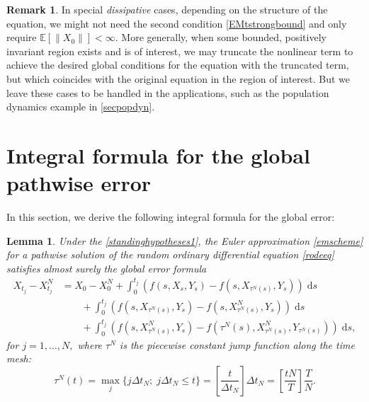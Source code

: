 \documentclass[reqno,12pt]{amsart}
\theoremstyle{plain} %
\newtheorem{lemma}{Lemma}[section]
\theoremstyle{definition} %
\newtheorem{remark}{Remark}[section]
\begin{document}
\begin{remark}
    In special \emph{dissipative} cases, depending on the structure of the equation, we might not need the second condition \eqref{EMtstrongbound} and only require $\mathbb{E}[\|X_0\|] < \infty$. More generally, when some bounded, positively invariant region exists and is of interest, we may truncate the nonlinear term to achieve the desired global conditions for the equation with the truncated term, but which coincides with the original equation in the region of interest. But we leave these cases to be handled in the applications, such as the population dynamics example in \cref{secpopdyn}.
\end{remark}

\section{Integral formula for the global pathwise error}

In this section, we derive the following integral formula for the global error:
\begin{lemma}
    \label{lemglobalerrorintegralformula}
    Under the \cref{standinghypotheses1}, the Euler approximation \eqref{emscheme} for a pathwise solution of the random ordinary differential equation \eqref{rodeeq} satisfies almost surely the global error formula
    \begin{equation}
        \label{globalerrorintegralformula}
        \begin{aligned}
            X_{t_j} - X_{t_j}^N & = X_0 - X_0^N + \int_0^{t_j} \left( f(s, X_s, Y_s) - f(s, X_{\tau^N(s)}, Y_s) \right)\;\mathrm{d}s  \\ 
            & \qquad + \int_{0}^{t_j} \left( f(s, X_{\tau^N(s)}, Y_s) - f(s, X_{\tau^N(s)}^N, Y_s) \right)\;\mathrm{d}s \\
            & \qquad + \int_0^{t_j} \left( f(s, X_{\tau^N(s)}^N, Y_s) - f(\tau^N(s), X_{\tau^N(s)}^N, Y_{\tau^N(s)}) \right)\;\mathrm{d}s,
        \end{aligned}
    \end{equation}
    for $j = 1, \ldots, N,$ where $\tau^N$ is the piecewise constant jump function along the time mesh:
    \begin{equation}
        \label{tauNt}
        \tau^N(t) = \max_j\{j\Delta t_N; \; j\Delta t_N \leq t\} = \left[\frac{t}{\Delta t_N}\right]\Delta t_N = \left[\frac{tN}{T}\right]\frac{T}{N}.
    \end{equation}
\end{lemma}
\end{document}

